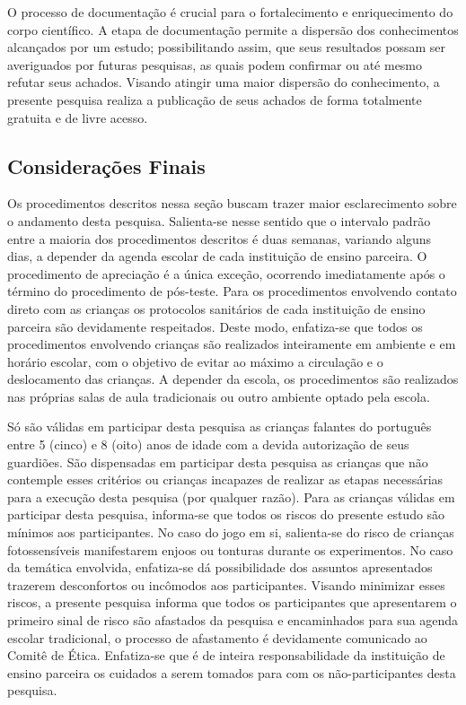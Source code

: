 O processo de documentação é crucial para o fortalecimento e enriquecimento do corpo científico. A etapa de documentação permite a dispersão dos conhecimentos alcançados por um estudo; possibilitando assim, que seus resultados possam ser averiguados por futuras pesquisas, as quais podem confirmar ou até mesmo refutar seus achados. Visando atingir uma maior dispersão do conhecimento, a presente pesquisa realiza a publicação de seus achados de forma totalmente gratuita e de livre acesso.


\subsection{Considerações Finais}\label{subsec:CF}

Os procedimentos descritos nessa seção buscam trazer maior esclarecimento sobre o andamento desta pesquisa. Salienta-se nesse sentido que o intervalo padrão entre a maioria dos procedimentos descritos é duas semanas, variando alguns dias, a depender da agenda escolar de cada instituição de ensino parceira. O procedimento de apreciação é a única exceção, ocorrendo imediatamente após o término do procedimento de pós-teste. Para os procedimentos envolvendo contato direto com as crianças os protocolos sanitários de cada instituição de ensino parceira são devidamente respeitados. Deste modo, enfatiza-se que todos os procedimentos envolvendo crianças são realizados inteiramente em ambiente e em horário escolar, com o objetivo de evitar ao máximo a circulação e o deslocamento das crianças. A depender da escola, os procedimentos são realizados nas próprias salas de aula tradicionais ou outro ambiente optado pela escola. 

Só são válidas em participar desta pesquisa as crianças falantes do português entre 5 (cinco) e 8 (oito) anos de idade com a devida autorização de seus guardiões. São dispensadas em participar desta pesquisa as crianças que não contemple esses critérios ou crianças incapazes de realizar as etapas necessárias para a execução desta pesquisa (por qualquer razão). Para as crianças válidas em participar desta pesquisa, informa-se que todos os riscos do presente estudo são mínimos aos participantes. No caso do jogo em si, salienta-se do risco de crianças fotossensíveis manifestarem enjoos ou tonturas durante os experimentos. No caso da temática envolvida, enfatiza-se dá possibilidade dos assuntos apresentados trazerem desconfortos ou incômodos aos participantes. Visando minimizar esses riscos, a presente pesquisa informa que todos os participantes que apresentarem o primeiro sinal de risco são afastados da pesquisa e encaminhados para sua agenda escolar tradicional, o processo de afastamento é devidamente comunicado ao Comitê de Ética. %
Enfatiza-se que é de inteira responsabilidade da instituição de ensino parceira os cuidados a serem tomados para com os não-participantes desta pesquisa. 

